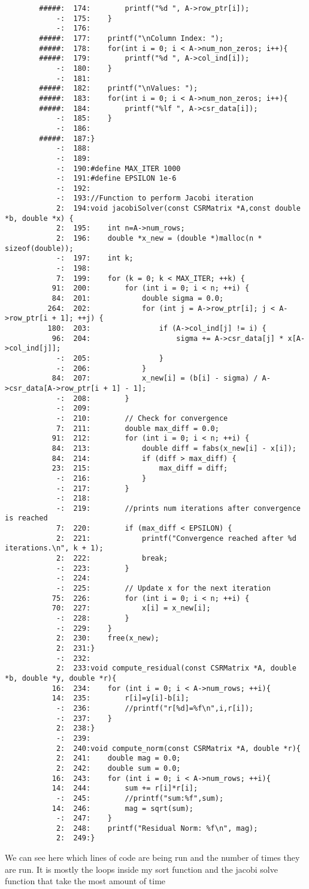 \documentclass[12pt]{article}
\begin{document}
\begin{mdframed}[style=myboxstyleTerminal1]
\begin{verbatim}
		#####:  174:        printf("%d ", A->row_ptr[i]);
			-:  175:    }
			-:  176:
		#####:  177:    printf("\nColumn Index: ");
		#####:  178:    for(int i = 0; i < A->num_non_zeros; i++){
		#####:  179:        printf("%d ", A->col_ind[i]);
			-:  180:    }
			-:  181:
		#####:  182:    printf("\nValues: ");
		#####:  183:    for(int i = 0; i < A->num_non_zeros; i++){
		#####:  184:        printf("%lf ", A->csr_data[i]);
			-:  185:    }
			-:  186:
		#####:  187:}
			-:  188:
			-:  189:
			-:  190:#define MAX_ITER 1000
			-:  191:#define EPSILON 1e-6
			-:  192:
			-:  193://Function to perform Jacobi iteration
			2:  194:void jacobiSolver(const CSRMatrix *A,const double *b, double *x) {
			2:  195:    int n=A->num_rows;
			2:  196:    double *x_new = (double *)malloc(n * sizeof(double));
			-:  197:    int k;
			-:  198:
			7:  199:    for (k = 0; k < MAX_ITER; ++k) {
		   91:  200:        for (int i = 0; i < n; ++i) {
		   84:  201:            double sigma = 0.0;
		  264:  202:            for (int j = A->row_ptr[i]; j < A->row_ptr[i + 1]; ++j) {
		  180:  203:                if (A->col_ind[j] != i) {
		   96:  204:                    sigma += A->csr_data[j] * x[A->col_ind[j]];
			-:  205:                }
			-:  206:            }
		   84:  207:            x_new[i] = (b[i] - sigma) / A->csr_data[A->row_ptr[i + 1] - 1];
			-:  208:        }
			-:  209:
			-:  210:        // Check for convergence
			7:  211:        double max_diff = 0.0;
		   91:  212:        for (int i = 0; i < n; ++i) {
		   84:  213:            double diff = fabs(x_new[i] - x[i]);
		   84:  214:            if (diff > max_diff) {
		   23:  215:                max_diff = diff;
			-:  216:            }
			-:  217:        }
			-:  218:
			-:  219:        //prints num iterations after convergence is reached
			7:  220:        if (max_diff < EPSILON) {
			2:  221:            printf("Convergence reached after %d iterations.\n", k + 1);
			2:  222:            break;
			-:  223:        }
			-:  224:
			-:  225:        // Update x for the next iteration
		   75:  226:        for (int i = 0; i < n; ++i) {
		   70:  227:            x[i] = x_new[i];
			-:  228:        }
			-:  229:    }
			2:  230:    free(x_new);
			2:  231:}
			-:  232:
			2:  233:void compute_residual(const CSRMatrix *A, double *b, double *y, double *r){
		   16:  234:    for (int i = 0; i < A->num_rows; ++i){
		   14:  235:        r[i]=y[i]-b[i];
			-:  236:        //printf("r[%d]=%f\n",i,r[i]);
			-:  237:    }
			2:  238:}
			-:  239:
			2:  240:void compute_norm(const CSRMatrix *A, double *r){
			2:  241:    double mag = 0.0;
			2:  242:    double sum = 0.0;
		   16:  243:    for (int i = 0; i < A->num_rows; ++i){
		   14:  244:        sum += r[i]*r[i];
			-:  245:        //printf("sum:%f",sum);
		   14:  246:        mag = sqrt(sum);
			-:  247:    }
			2:  248:    printf("Residual Norm: %f\n", mag);
			2:  249:}		
		\end{verbatim}
	\end{mdframed}
	We can see here which lines of code are being run and the number of times they are run.
	It is mostly the loops inside my sort function and the jacobi solve function that take the most amount of time
	
\end{document}
